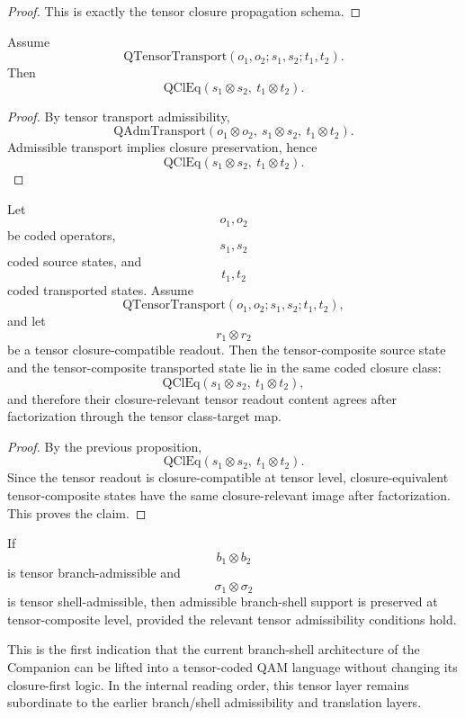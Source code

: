 \begin{proof}
This is exactly the tensor closure propagation schema.
\end{proof}

\begin{proposition}
Assume
\[
\mathrm{QTensorTransport}(o_1,o_2;s_1,s_2;t_1,t_2).
\]
Then
\[
\mathrm{QClEq}(s_1\otimes s_2,\ t_1\otimes t_2).
\]
\end{proposition}

\begin{proof}
By tensor transport admissibility,
\[
\mathrm{QAdmTransport}(o_1\otimes o_2,\ s_1\otimes s_2,\ t_1\otimes t_2).
\]
Admissible transport implies closure preservation, hence
\[
\mathrm{QClEq}(s_1\otimes s_2,\ t_1\otimes t_2).
\]
\end{proof}

\begin{theorem}
Let
\[
o_1,o_2
\]
be coded operators,
\[
s_1,s_2
\]
coded source states,
and
\[
t_1,t_2
\]
coded transported states. Assume
\[
\mathrm{QTensorTransport}(o_1,o_2;s_1,s_2;t_1,t_2),
\]
and let
\[
r_1\otimes r_2
\]
be a tensor closure-compatible readout. Then the tensor-composite source state and the tensor-composite transported state lie in the same coded closure class:
\[
\mathrm{QClEq}(s_1\otimes s_2,\ t_1\otimes t_2),
\]
and therefore their closure-relevant tensor readout content agrees after factorization through the tensor class-target map.
\end{theorem}

\begin{proof}
By the previous proposition,
\[
\mathrm{QClEq}(s_1\otimes s_2,\ t_1\otimes t_2).
\]
Since the tensor readout is closure-compatible at tensor level, closure-equivalent tensor-composite states have the same closure-relevant image after factorization. This proves the claim.
\end{proof}

\begin{corollary}
If
\[
b_1\otimes b_2
\]
is tensor branch-admissible and
\[
\sigma_1\otimes \sigma_2
\]
is tensor shell-admissible, then admissible branch-shell support is preserved at tensor-composite level, provided the relevant tensor admissibility conditions hold.
\end{corollary}

\begin{remark}
This is the first indication that the current branch-shell architecture of the Companion can be lifted into a tensor-coded QAM language without changing its closure-first logic. In the internal reading order, this tensor layer remains subordinate to the earlier branch/shell admissibility and translation layers.
\end{remark}

